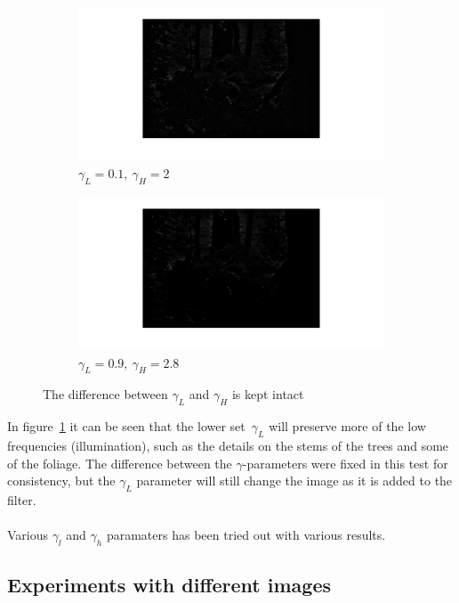 		\begin{figure}[h!]
        \centering
        \begin{subfigure}[b]{0.6\textwidth}
                \includegraphics[width=\textwidth]{../pics/gamma_difference_emph_lowfreq.png}
                \caption{$\gamma_L = 0.1,~\gamma_H = 2$}
                \label{fig:gamma_l_emph}
        \end{subfigure}%
        \begin{subfigure}[b]{0.6\textwidth}
                \includegraphics[width=\textwidth]{../pics/gamma_difference_no_emph_lowfreq.png}
                \caption{$\gamma_L = 0.9,~\gamma_H = 2.8$}
                \label{fig:gamma_l}
        \end{subfigure}
        \caption{The difference between $\gamma_L$ and $\gamma_H$ is kept intact}\label{fig:gamma_diff}
		\end{figure}
		In figure~\ref{fig:gamma_l_emph} it can be seen that the lower set~$\gamma_L$ will preserve
		more of the low frequencies (illumination), such as the details on the stems of the trees
		and some of the foliage. The difference between the $\gamma$-parameters were fixed in
		this test for consistency, but the $\gamma_L$ parameter will still change the image
		as it is added to the filter. %
		\\
		\\
		Various $\gamma_l$ and $\gamma_h$ paramaters has been tried out with various results.
		
	
	\subsection{Experiments with different images}

% 
